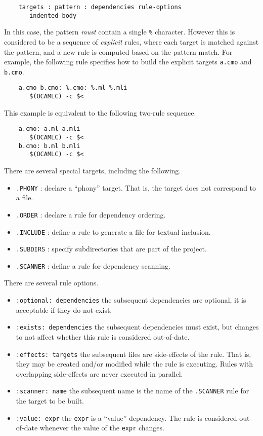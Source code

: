 \begin{verbatim}
    targets : pattern : dependencies rule-options
       indented-body
\end{verbatim}

In this case, the pattern \emph{must} contain a single \verb+%+ character.  However this is
considered to be a sequence of \emph{explicit} rules, where each target is matched against the
pattern, and a new rule is computed based on the pattern match.  For example, the following rule
specifies how to build the explicit targets \verb+a.cmo+ and \verb+b.cmo+.

\begin{verbatim}
    a.cmo b.cmo: %.cmo: %.ml %.mli
       $(OCAMLC) -c $<
\end{verbatim}

This example is equivalent to the following two-rule sequence.

\begin{verbatim}
    a.cmo: a.ml a.mli
       $(OCAMLC) -c $<
    b.cmo: b.ml b.mli
       $(OCAMLC) -c $<
\end{verbatim}

There are several special targets, including the following.

\begin{itemize}
\item \verb+.PHONY+ : declare a ``phony'' target.  That is, the target does not correspond to a file.
\item \verb+.ORDER+ : declare a rule for dependency ordering.
\item \verb+.INCLUDE+ : define a rule to generate a file for textual inclusion.
\item \verb+.SUBDIRS+ : specify subdirectories that are part of the project.
\item \verb+.SCANNER+ : define a rule for dependency scanning.
\end{itemize}

There are several rule options.

\begin{itemize}
\item \verb+:optional: dependencies+ the subsequent dependencies are optional, it is acceptable if they do not exist.
\item \verb+:exists: dependencies+ the subsequent dependencies must exist, but changes to not affect
whether this rule is considered out-of-date.
\item \verb+:effects: targets+ the subsequent files are side-effects of the rule.  That is, they may be
created and/or modified while the rule is executing.  Rules with overlapping side-effects are never
executed in parallel.
\item \verb+:scanner: name+ the subsequent name is the name of the \verb+.SCANNER+ rule for the target to be built.
\item \verb+:value: expr+ the \verb+expr+ is a ``value'' dependency.  The rule is considered
out-of-date whenever the value of the \verb+expr+ changes.
\end{itemize}


